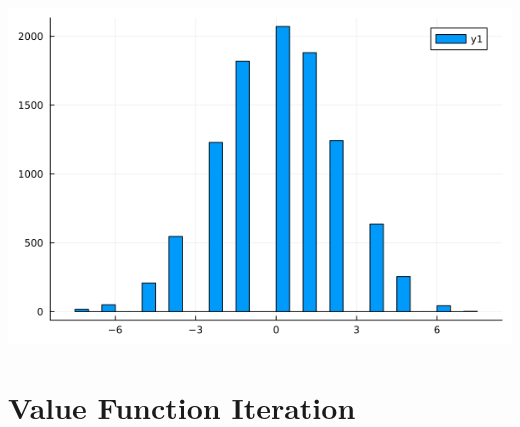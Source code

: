 \documentclass{article}
\begin{document}
\begin{center}
    \includegraphics[scale = 0.6]{p11.png} \\
\end{center}

\section*{Value Function Iteration}
\end{document}
